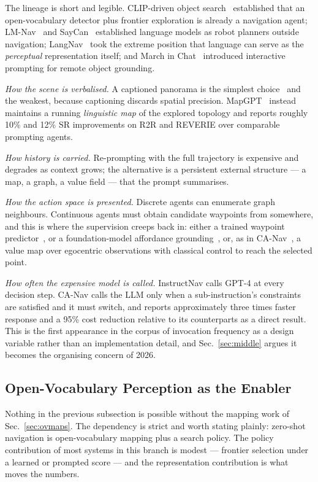 \documentclass[journal]{IEEEtran}
\begin{document}
The lineage is short and legible. CLIP-driven object
search~\cite{gadre2023cows} established that an open-vocabulary detector plus
frontier exploration is already a navigation agent; LM-Nav~\cite{shah2022lm}
and SayCan~\cite{ahn2022do} established language models as robot planners
outside navigation; LangNav~\cite{pan2024langnav} took the extreme position
that language can serve as the \emph{perceptual} representation itself; and
March in Chat~\cite{qiao2023march} introduced interactive prompting for
remote object grounding.

\emph{How the scene is verbalised.} A captioned panorama is the simplest
choice~\cite{long2024discuss} and the weakest, because captioning discards
spatial precision. MapGPT~\cite{chen2024mapgpt} instead maintains a running
\emph{linguistic map} of the explored topology and reports roughly 10\% and
12\% SR improvements on R2R and REVERIE over comparable prompting agents.

\emph{How history is carried.} Re-prompting with the full trajectory is
expensive and degrades as context grows; the alternative is a persistent
external structure --- a map, a graph, a value field --- that the prompt
summarises.

\emph{How the action space is presented.} Discrete agents can enumerate
graph neighbours. Continuous agents must obtain candidate waypoints from
somewhere, and this is where the supervision creeps back in: either a
trained waypoint predictor~\cite{qiao2025open}, or a foundation-model
affordance grounding~\cite{chen2024affordances}, or, as in
CA-Nav~\cite{chen2025constraint}, a value map over egocentric observations
with classical control to reach the selected point.

\emph{How often the expensive model is called.} InstructNav calls GPT-4 at
every decision step. CA-Nav calls the LLM only when a sub-instruction's
constraints are satisfied and it must switch, and reports approximately
three times faster response and a 95\% cost reduction relative to its
counterparts as a direct result. This is the first appearance in the corpus
of invocation frequency as a design variable rather than an
implementation detail, and Sec.~\ref{sec:middle} argues it becomes the
organising concern of 2026.

\subsection{Open-Vocabulary Perception as the Enabler}
Nothing in the previous subsection is possible without the mapping work of
Sec.~\ref{sec:ovmaps}. The dependency is strict and worth stating plainly:
zero-shot navigation is open-vocabulary mapping plus a search policy. The
policy contribution of most systems in this branch is modest --- frontier
selection under a learned or prompted score --- and the representation
contribution is what moves the numbers.
\end{document}
